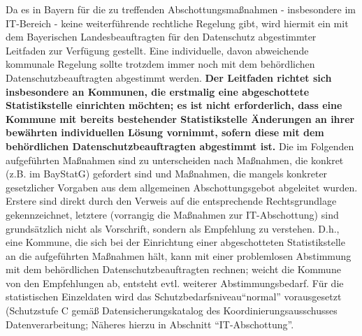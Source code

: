 Da es in Bayern für die zu treffenden Abschottungsmaßnahmen  - insbesondere im IT-Bereich - keine weiterführende rechtliche Regelung gibt, wird hiermit ein mit dem Bayerischen Landesbeauftragten für den Datenschutz abgestimmter Leitfaden zur Verfügung gestellt. Eine individuelle, davon abweichende kommunale Regelung sollte trotzdem immer noch mit dem behördlichen Datenschutzbeauftragten abgestimmt werden.
\newline
\textbf{Der Leitfaden richtet sich insbesondere an Kommunen, die erstmalig eine abgeschottete Statistikstelle einrichten möchten; es ist nicht erforderlich, dass eine Kommune mit bereits bestehender Statistikstelle Änderungen an ihrer bewährten individuellen Lösung vornimmt, sofern diese mit dem behördlichen Datenschutzbeauftragten abgestimmt ist.}
\newline
Die im Folgenden aufgeführten Maßnahmen sind zu unterscheiden nach Maßnahmen, die konkret (z.B. im BayStatG) gefordert sind und Maßnahmen, die mangels konkreter gesetzlicher Vorgaben aus dem allgemeinen Abschottungsgebot abgeleitet wurden. Erstere sind direkt durch den Verweis auf die entsprechende Rechtsgrundlage gekennzeichnet, letztere (vorrangig die Maßnahmen zur IT-Abschottung) sind grundsätzlich nicht als Vorschrift, sondern als Empfehlung zu verstehen. D.h., eine Kommune, die sich bei der Einrichtung einer abgeschotteten Statistikstelle an die aufgeführten Maßnahmen hält, kann mit einer problemlosen Abstimmung mit dem behördlichen Datenschutzbeauftragten rechnen; weicht die Kommune von den Empfehlungen ab, entsteht evtl. weiterer Abstimmungsbedarf. Für die statistischen Einzeldaten wird das Schutzbedarfsniveau``normal'' vorausgesetzt (Schutzstufe C gemäß Datensicherungskatalog des Koordinierungsausschusses Datenverarbeitung; Näheres hierzu in Abschnitt ``IT-Abschottung''.
